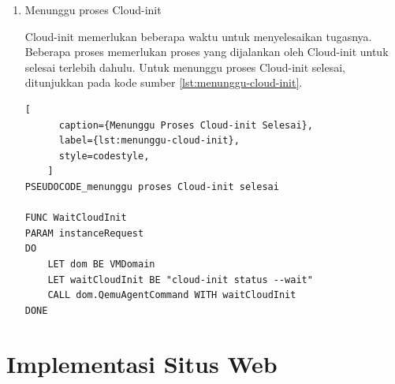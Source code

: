 \begin{enumerate}
\begin{lstlisting}[
      caption={Konfigurasi xml \emph{Virtual Machine}},
      label={lst:konfigurasi-xml-virtual-machine},
      style=codestyle,
    ]
FUNC CreateVirtualMachineXml
PARAM instanceName, instanceConfig
RETURN string
DO
    LET instanceIso BE image_dir + "/" + instanceName
    LET cloudConfig BE cloud_config_dir + "/" + instanceName
    LET xmlConfig BE libvirtXml WITH instanceIso, cloudConfig

    RETURN xmlConfig
DONE
    \end{lstlisting}

    Setelah konfigurasi xml dari \emph{virtual machine} telah dibuat, Libvirt
    dapat menggunakan konfigurasi tersebut untuk membuat \emph{virtual machine}.
    Kode sumber untuk membuat \emph{virtual machine} menggunakan konfigurasi
    xml dapat dilihat pada kode sumber \ref{lst:pembuatan-vm}.

    \begin{lstlisting}[
      caption={Pembuatan \emph{Virtual Machine}},
      label={lst:pembuatan-vm},
      style=codestyle,
    ]
PSEUDOCODE_pembuatan virtual machine

FUNC CreateVirtualMachine
PARAM instanceRequest
RETURN 
DO
    LET instanceName BE random_string
    LET conn BE CALL InitLibvirtConnection

    CALL CreateNetwork
    LET configuration BE CALL CreateVMCloudInit
    CALL CopyImage WITH instanceName, instanceRequest
    CALL conn.CreateVM WITH configuration
DONE
    \end{lstlisting}

  \item Menunggu proses Cloud-init

    Cloud-init memerlukan beberapa waktu untuk menyelesaikan tugasnya.
    Beberapa proses memerlukan proses yang dijalankan oleh Cloud-init
    untuk selesai terlebih dahulu. Untuk menunggu proses Cloud-init selesai,
    ditunjukkan pada kode sumber \ref{lst:menunggu-cloud-init}.

    \begin{lstlisting}[
      caption={Menunggu Proses Cloud-init Selesai},
      label={lst:menunggu-cloud-init},
      style=codestyle,
    ]
PSEUDOCODE_menunggu proses Cloud-init selesai

FUNC WaitCloudInit
PARAM instanceRequest
DO
    LET dom BE VMDomain
    LET waitCloudInit BE "cloud-init status --wait"
    CALL dom.QemuAgentCommand WITH waitCloudInit
DONE
    \end{lstlisting}

\end{enumerate}

\section{Implementasi Situs Web}
\label{sec:implementas-situs-web}

